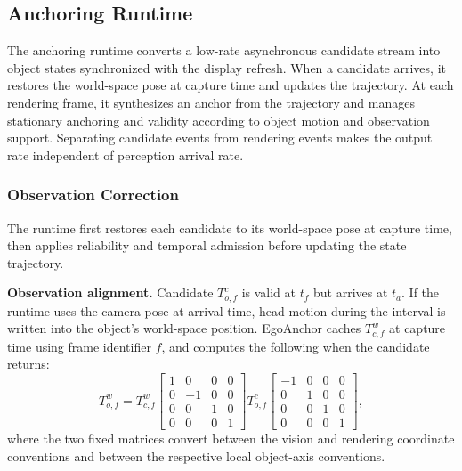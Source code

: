 \documentclass[review]{vgtc}
\begin{document}
\subsection{Anchoring Runtime}\label{sec:anchoring}

The anchoring runtime converts a low-rate asynchronous candidate stream into object states synchronized with the display refresh. When a candidate arrives, it restores the world-space pose at capture time and updates the trajectory. At each rendering frame, it synthesizes an anchor from the trajectory and manages stationary anchoring and validity according to object motion and observation support. Separating candidate events from rendering events makes the output rate independent of perception arrival rate.

\subsubsection{Observation Correction}\label{sec:obs-update}

The runtime first restores each candidate to its world-space pose at capture time, then applies reliability and temporal admission before updating the state trajectory.

\textbf{Observation alignment.} Candidate $T_{o,f}^{c}$ is valid at $t_f$ but arrives at $t_a$. If the runtime uses the camera pose at arrival time, head motion during the interval is written into the object's world-space position. EgoAnchor caches $T_{c,f}^{w}$ at capture time using frame identifier $f$, and computes the following when the candidate returns:
\begin{equation}
T_{o,f}^{w} = T_{c,f}^{w}
\begin{bmatrix}
1 & 0 & 0 & 0 \\
0 & -1 & 0 & 0 \\
0 & 0 & 1 & 0 \\
0 & 0 & 0 & 1
\end{bmatrix}
T_{o,f}^{c}
\begin{bmatrix}
-1 & 0 & 0 & 0 \\
0 & 1 & 0 & 0 \\
0 & 0 & 1 & 0 \\
0 & 0 & 0 & 1
\end{bmatrix},
\label{eq:capture-alignment}
\end{equation}
where the two fixed matrices convert between the vision and rendering coordinate conventions and between the respective local object-axis conventions.
\end{document}
